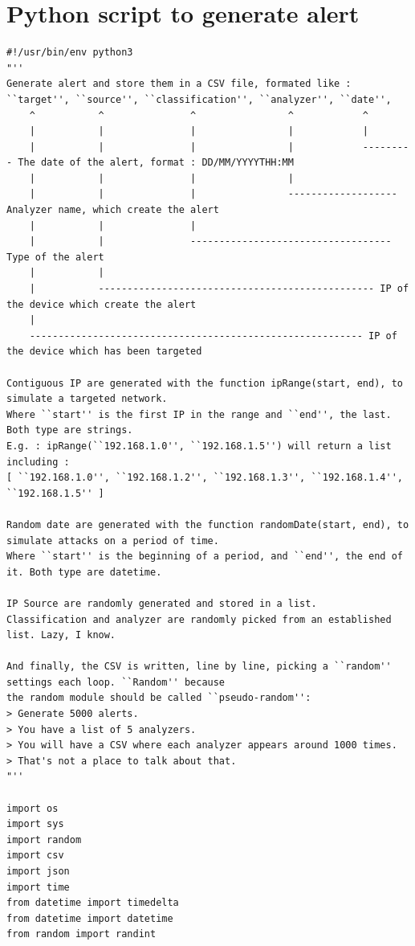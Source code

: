 \documentclass{koala-en}
\begin{document}
\section{Python script to generate alert}
\begin{lstlisting}
#!/usr/bin/env python3
"''
Generate alert and store them in a CSV file, formated like :
``target'', ``source'', ``classification'', ``analyzer'', ``date'',
    ^           ^               ^                ^            ^
    |           |               |                |            |
    |           |               |                |            --------- The date of the alert, format : DD/MM/YYYYTHH:MM
    |           |               |                |
    |           |               |                ------------------- Analyzer name, which create the alert
    |           |               |
    |           |               ----------------------------------- Type of the alert
    |           |
    |           ------------------------------------------------ IP of the device which create the alert
    |
    ---------------------------------------------------------- IP of the device which has been targeted

Contiguous IP are generated with the function ipRange(start, end), to simulate a targeted network.
Where ``start'' is the first IP in the range and ``end'', the last. Both type are strings.
E.g. : ipRange(``192.168.1.0'', ``192.168.1.5'') will return a list including :
[ ``192.168.1.0'', ``192.168.1.2'', ``192.168.1.3'', ``192.168.1.4'', ``192.168.1.5'' ]

Random date are generated with the function randomDate(start, end), to simulate attacks on a period of time.
Where ``start'' is the beginning of a period, and ``end'', the end of it. Both type are datetime.

IP Source are randomly generated and stored in a list.
Classification and analyzer are randomly picked from an established list. Lazy, I know.

And finally, the CSV is written, line by line, picking a ``random'' settings each loop. ``Random'' because
the random module should be called ``pseudo-random'':
> Generate 5000 alerts.
> You have a list of 5 analyzers.
> You will have a CSV where each analyzer appears around 1000 times.
> That's not a place to talk about that.
"''

import os
import sys
import random
import csv
import json
import time
from datetime import timedelta
from datetime import datetime
from random import randint


\end{lstlisting}
\end{document}
